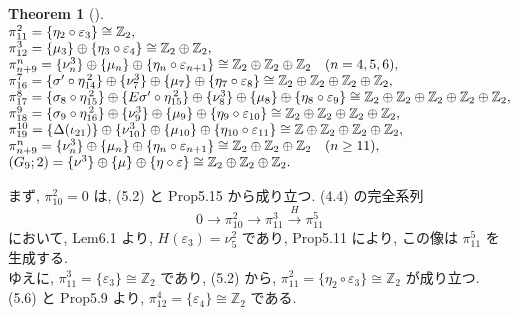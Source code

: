 \documentclass[10pt, leqno]{ltjsarticle}
\makeatletter
\newenvironment{Thleft}[1][]{%
  \begin{theorem}[#1]\mbox{}\\[0ex]\begingroup
  \setlength{\arraycolsep}{0pt}%
  \renewcommand{\arraystretch}{1.0}%
  \noindent$\begin{array}{@{}l@{}}%
}{%
  \end{array}$\par\endgroup\end{theorem}%
}
\newcommand{\gen}[1]{\{#1\}}       %
\newcommand{\pit}[2]{\pi_{#1}^{#2}}
\numberwithin{equation}{section}
\theoremstyle{plain}
\newtheorem{theorem}{Theorem}[section]
\theoremstyle{definition}
\theoremstyle{remark}
\makeatother
\begin{document}
\begin{paracol}{2}
\begin{Thleft}[]
\pit{11}{2}=\gen{\eta_{2}\circ\varepsilon_{3}}\cong\mathbb Z_{2},\qquad\\
\pit{12}{3}=\gen{\mu_{3}}\oplus\gen{\eta_{3}\circ\varepsilon_{4}}\cong\mathbb Z_{2}\oplus\mathbb Z_{2},\\
\pit{n+9}{n}=\gen{\nu_{n}^{3}}\oplus\gen{\mu_{n}}\oplus\gen{\eta_{n}\circ\varepsilon_{n+1}}
\cong\mathbb Z_{2}\oplus\mathbb Z_{2}\oplus\mathbb Z_{2}\quad (n=4,5,6),\\
\pit{16}{7}=\gen{\sigma'\circ\eta_{14}^{\,2}}\oplus\gen{\nu_{7}^{3}}\oplus\gen{\mu_{7}}\oplus\gen{\eta_{7}\circ\varepsilon_{8}}
\cong\mathbb Z_{2}\oplus\mathbb Z_{2}\oplus\mathbb Z_{2}\oplus\mathbb Z_{2},\\
\pit{17}{8}=\gen{\sigma_{8}\circ\eta_{15}^{\,2}}\oplus\gen{E\sigma'\circ\eta_{15}^{\,2}}\oplus\gen{\nu_{8}^{3}}\oplus\gen{\mu_{8}}\oplus\gen{\eta_{8}\circ\varepsilon_{9}}
\cong\mathbb Z_{2}\oplus\mathbb Z_{2}\oplus\mathbb Z_{2}\oplus\mathbb Z_{2}\oplus\mathbb Z_{2},\\
\pit{18}{9}=\gen{\sigma_{9}\circ\eta_{16}^{\,2}}\oplus\gen{\nu_{9}^{3}}\oplus\gen{\mu_{9}}\oplus\gen{\eta_{9}\circ\varepsilon_{10}}
\cong\mathbb Z_{2}\oplus\mathbb Z_{2}\oplus\mathbb Z_{2}\oplus\mathbb Z_{2},\\
\pit{19}{10}=\gen{\Delta(\iota_{21})}\oplus\gen{\nu_{10}^{3}}\oplus\gen{\mu_{10}}\oplus\gen{\eta_{10}\circ\varepsilon_{11}}
\cong\mathbb Z\oplus\mathbb Z_{2}\oplus\mathbb Z_{2}\oplus\mathbb Z_{2},\\
\pit{n+9}{n}=\gen{\nu_{n}^{3}}\oplus\gen{\mu_{n}}\oplus\gen{\eta_{n}\circ\varepsilon_{n+1}}
\cong\mathbb Z_{2}\oplus\mathbb Z_{2}\oplus\mathbb Z_{2}\quad (n\ge11),\\
(G_{9};2)=\gen{\nu^{3}}\oplus\gen{\mu}\oplus\gen{\eta\circ\varepsilon}\cong\mathbb Z_{2}\oplus\mathbb Z_{2}\oplus\mathbb Z_{2}.
\end{Thleft}

まず, \(\pit{10}{2}=0\) は, (5.2) と Prop5.15 から成り立つ. 
(4.4) の完全系列
\[
0\longrightarrow \pit{10}{2}
\longrightarrow \pit{11}{3}
\xrightarrow{\,H\,}\pit{11}{5}
\]
において,  Lem6.1 より,
\(H(\varepsilon_{3})=\nu_{5}^{2}\) であり, 
Prop5.11 により, 
この像は \(\pit{11}{5}\) を生成する. \\
ゆえに, \(\pit{11}{3}=\gen{\varepsilon_{3}}\cong\mathbb Z_{2}\) であり, 
(5.2) から,
\(\pit{11}{2}=\gen{\eta_{2}\circ\varepsilon_{3}}\cong\mathbb Z_{2}\) が成り立つ. \\
(5.6) と Prop5.9 より, 
\(\pit{12}{4}=\gen{\varepsilon_{4}}\cong\mathbb Z_{2}\) である.


\end{paracol}
\end{document}
